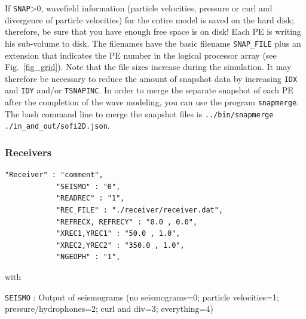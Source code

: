 If \texttt{SNAP}>0, wavefield information (particle velocities, pressure or curl and divergence of particle velocities) for the entire model is saved on the hard disk; therefore, be sure that you have enough free space is on disk! Each PE is writing his sub-volume to disk. The filenames have the basic filename \texttt{SNAP\_FILE} plus an extension that indicates the PE number in the logical processor array (see Fig.~\ref{fig_grid}). Note that the file sizes increase during the simulation. It may therefore be necessary to reduce the amount of snapshot data by increasing \texttt{IDX} and \texttt{IDY} and/or \texttt{TSNAPINC}. In order to merge the separate snapshot of each PE after the completion of the wave modeling, you can use the program \texttt{snapmerge}. The bash command line to merge the snapshot files is \texttt{../bin/snapmerge ./in\_and\_out/sofi2D.json}.

\subsubsection{Receivers}
\begin{verbatim}
"Receiver" : "comment",
            "SEISMO" : "0",
            "READREC" : "1",
            "REC_FILE" : "./receiver/receiver.dat",
            "REFRECX, REFRECY" : "0.0 , 0.0",
            "XREC1,YREC1" : "50.0 , 1.0",
            "XREC2,YREC2" : "350.0 , 1.0",
            "NGEOPH" : "1",
\end{verbatim}

with

\texttt{SEISMO} : Output of seismograms (no seismograms=0; particle velocities=1; pressure/hydrophones=2; curl and div=3; everything=4)

